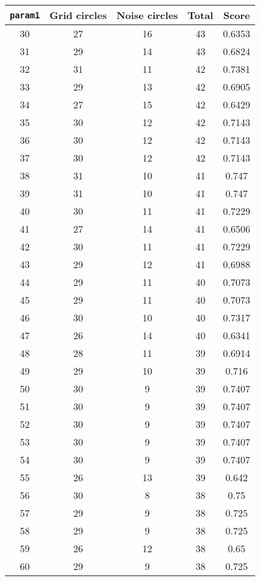 \documentclass[letterpaper, 12pt]{article}
\begin{document}
\begin{longtable}{|c|c|c|c|c|}
\hline
\textbf{\texttt{param1}} & \textbf{Grid circles} & \textbf{Noise circles} & \textbf{Total} & \textbf{Score} \\
\hline
30 & 27 & 16 & 43 & 0.6353 \\
\hline
31 & 29 & 14 & 43 & 0.6824 \\
\hline
32 & 31 & 11 & 42 & 0.7381 \\
\hline
33 & 29 & 13 & 42 & 0.6905 \\
\hline
34 & 27 & 15 & 42 & 0.6429 \\
\hline
35 & 30 & 12 & 42 & 0.7143 \\
\hline
36 & 30 & 12 & 42 & 0.7143 \\
\hline
37 & 30 & 12 & 42 & 0.7143 \\
\hline
38 & 31 & 10 & 41 & 0.747 \\
\hline
39 & 31 & 10 & 41 & 0.747 \\
\hline
40 & 30 & 11 & 41 & 0.7229 \\
\hline
41 & 27 & 14 & 41 & 0.6506 \\
\hline
42 & 30 & 11 & 41 & 0.7229 \\
\hline
43 & 29 & 12 & 41 & 0.6988 \\
\hline
44 & 29 & 11 & 40 & 0.7073 \\
\hline
45 & 29 & 11 & 40 & 0.7073 \\
\hline
46 & 30 & 10 & 40 & 0.7317 \\
\hline
47 & 26 & 14 & 40 & 0.6341 \\
\hline
48 & 28 & 11 & 39 & 0.6914 \\
\hline
49 & 29 & 10 & 39 & 0.716 \\
\hline
50 & 30 & 9 & 39 & 0.7407 \\
\hline
51 & 30 & 9 & 39 & 0.7407 \\
\hline
52 & 30 & 9 & 39 & 0.7407 \\
\hline
53 & 30 & 9 & 39 & 0.7407 \\
\hline
54 & 30 & 9 & 39 & 0.7407 \\
\hline
55 & 26 & 13 & 39 & 0.642 \\
\hline
56 & 30 & 8 & 38 & 0.75 \\
\hline
57 & 29 & 9 & 38 & 0.725 \\
\hline
58 & 29 & 9 & 38 & 0.725 \\
\hline
59 & 26 & 12 & 38 & 0.65 \\
\hline
60 & 29 & 9 & 38 & 0.725 \\
\hline

\end{longtable}
\end{document}
